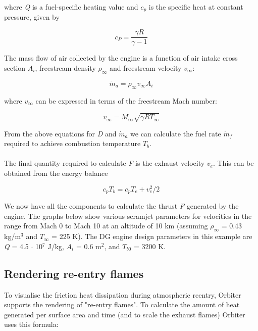 \documentclass[Orbiter Developer Manual.tex]{subfiles}
\begin{document}
\noindent
where \textit{Q} is a fuel-specific heating value and $c_{p}$ is the specific heat at constant pressure, given by

\[ c_{P} = \frac{\gamma R}{\gamma - 1} \]

\noindent
The mass flow of air collected by the engine is a function of air intake cross section $A_{i}$, freestream density $\rho_{\infty}$ and freestream velocity $v_{\infty}$:

\[ \dot{m}_{a} = \rho_{\infty} v_{\infty} A_{i} \]

\noindent
where $v_{\infty}$ can be expressed in terms of the freestream Mach number:

\[ v_{\infty} = M_{\infty} \sqrt{\gamma R T_{\infty}} \]

\noindent
From the above equations for \textit{D} and $\dot{m}_{a}$ we can calculate the fuel rate $\dot{m}_{f}$ required to achieve combustion temperature $T_{b}$.\\
\\
The final quantity required to calculate \textit{F} is the exhaust velocity $v_{e}$. This can be obtained from the energy balance

\[ c_{p} T_{b} = c_{p} T_{e} + v^{2}_{e} / 2 \]

\noindent
We now have all the components to calculate the thrust \textit{F} generated by the engine. The graphs below show various scramjet parameters for velocities in the range from Mach 0 to Mach 10 at an altitude of 10 km (assuming $\rho_{\infty}$ = 0.43 kg/m$^{3}$ and $T_{\infty}$ = 225 K). The DG engine design parameters in this example are \textit{Q} = 4.5 $\cdot$ 10$^{7}$ J/kg, $A_{i}$ = 0.6 m$^{2}$, and $T_{b0}$ = 3200 K.

\begin{figure}[H]
	\centering
\end{figure}


\subsection{Rendering re-entry flames}
To visualise the friction heat dissipation during atmospheric reentry, Orbiter supports the rendering of "re-entry flames". To calculate the amount of heat generated per surface area and time (and to scale the exhaust flames) Orbiter uses this formula:
\end{document}
